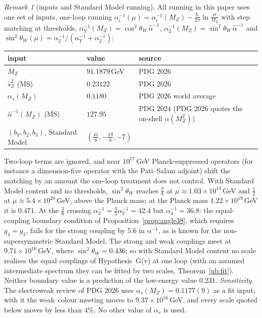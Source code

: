 \documentclass[aps,pra,onecolumn,superscriptaddress,nofootinbib,10pt]{revtex4-2}
\theoremstyle{definition}
\theoremstyle{remark}
\newtheorem{remark}[theorem]{Remark}
\begin{document}
\begin{remark}[inputs and Standard Model running]\label{rem:scales}
All running in this paper uses one set of inputs, one-loop running
$\alpha_i^{-1}(\mu)=\alpha_i^{-1}(M_Z)-\frac{b_i}{2\pi}\ln\frac\mu{M_Z}$ with step matching at thresholds, $\alpha_Y^{-1}(M_Z)=\cos^2\theta_W\,\hat\alpha^{-1}$,
$\alpha_2^{-1}(M_Z)=\sin^2\theta_W\,\hat\alpha^{-1}$ and $\sin^2\theta_W(\mu)=\alpha_2^{-1}/(\alpha_Y^{-1}+\alpha_2^{-1})$:
\begin{center}\footnotesize
\begin{tabular}{@{}lll@{}}
\toprule
input & value & source\\
\midrule
$M_Z$ & $91.1879$\,GeV & PDG 2026 \cite{ex-PDG26}\\
$\hat s_Z^2$ ($\overline{\mathrm{MS}}$) & $0.23122$ & PDG 2026 \cite{ex-PDG26}\\
$\alpha_s(M_Z)$ & $0.1180$ & PDG 2026 world average \cite{ex-PDG26}\\
$\hat\alpha^{-1}(M_Z)$ ($\overline{\mathrm{MS}}$) & $127.95$ & PDG 2024 \cite{PDG} (PDG 2026 quotes the on-shell $\alpha(M_Z^2)$)\\
$(b_Y,b_2,b_3)$, Standard Model & $(\tfrac{41}6,-\tfrac{19}6,-7)$ & \\
\bottomrule
\end{tabular}
\end{center}
Two-loop terms are ignored, and near $10^{17}$\,GeV Planck-suppressed operators (for instance a dimension-five operator with
the Pati--Salam adjoint) shift the matching by an amount the one-loop treatment does not control.  With Standard
Model content and no thresholds, $\sin^2\theta_W$ reaches $\tfrac38$ at $\mu\approx1.03\times10^{13}$\,GeV and $\tfrac12$ at $\mu\approx5.4\times10^{20}$\,GeV, above the
Planck mass; at the Planck mass $1.22\times10^{19}$\,GeV it is $0.471$.  At the $\tfrac38$ crossing $\alpha_2^{-1}=\tfrac35\alpha_Y^{-1}=42.4$ but
$\alpha_3^{-1}=36.8$: the equal-coupling boundary condition of Proposition~\ref{prop:angle38}, which requires $g_4=g_3$, fails for
the strong coupling by $5.6$ in $\alpha^{-1}$, as is known for the non-supersymmetric Standard Model.  The strong and
weak couplings meet at $9.71\times10^{16}$\,GeV, where $\sin^2\theta_W=0.436$; so with Standard Model content no scale realises the
equal couplings of Hypothesis~G(v) at one loop (with an assumed intermediate spectrum they can be fitted by two
scales, Theorem~\ref{ub:fit}).  Neither boundary value is a prediction of the low-energy value $0.231$.
\emph{Sensitivity.}  The electroweak review of PDG 2026 uses $\alpha_s(M_Z)=0.1177(9)$ as a fit input; with it the
weak--colour meeting moves to $9.37\times10^{16}$\,GeV, and every scale quoted below moves by less than $4\%$.  No other value
of $\alpha_s$ is used.
\end{remark}
\end{document}
